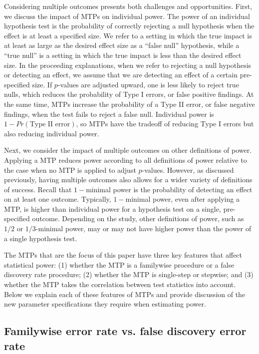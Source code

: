 \documentclass[
]{article}
\begin{document}
Considering multiple outcomes presents both challenges and
opportunities. First, we discuss the impact of MTPs on individual power.
The power of an individual hypothesis test is the probability of
correctly rejecting a null hypothesis when the effect is at least a
specified size. We refer to a setting in which the true impact is at
least as large as the desired effect size as a ``false null''
hypothesis, while a ``true null'' is a setting in which the true impact
is less than the desired effect size. In the proceeding explanations,
when we refer to rejecting a null hypothesis or detecting an effect, we
assume that we are detecting an effect of a certain pre-specified size.
If \(p\)-values are adjusted upward, one is less likely to reject true
nulls, which reduces the probability of Type I errors, or false positive
findings. At the same time, MTPs increase the probability of a Type II
error, or false negative findings, when the test fails to reject a false
null. Individual power is \(1 - Pr(\text{Type II error})\), so MTPs have
the tradeoff of reducing Type I errors but also reducing individual
power.

Next, we consider the impact of multiple outcomes on other definitions
of power. Applying a MTP reduces power according to all definitions of
power relative to the case when no MTP is applied to adjust
\(p\)-values. However, as discussed previously, having multiple outcomes
also allows for a wider variety of definitions of success. Recall that
\(1-\)minimal power is the probability of detecting an effect on at
least one outcome. Typically, \(1-\)minimal power, even after applying a
MTP, is higher than individual power for a hypothesis test on a single,
pre-specified outcome. Depending on the study, other definitions of
power, such as \(1/2\) or \(1/3\)-minimal power, may or may not have
higher power than the power of a single hypothesis test.

The MTPs that are the focus of this paper have three key features that
affect statistical power: (1) whether the MTP is a familywise procedure
or a false discovery rate procedure; (2) whether the MTP is single-step
or stepwise; and (3) whether the MTP takes the correlation between test
statistics into account. Below we explain each of these features of MTPs
and provide discussion of the new parameter specifications they require
when estimating power.

\subsection{Familywise error rate vs. false discovery error rate}
\end{document}
